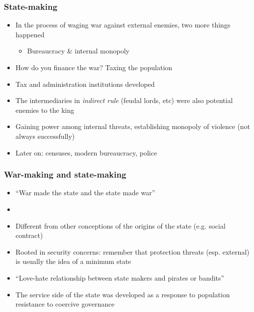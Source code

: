 \documentclass[utf8, xcolor=dvipsnames, handout]{beamer}
\begin{document}
\begin{frame}
\frametitle{State-making}
\centering

\begin{itemize}[<+->]
\item In the process of waging war against external enemies, two more things happened
\begin{itemize}
  \item Bureaucracy \& internal monopoly
\end{itemize}
\item How do you finance the war? Taxing the population
\item Tax and administration institutions developed
\item The intermediaries in \textit{indirect rule} (feudal lords, etc) were also potential enemies to the king
\item Gaining power among internal threats, establishing monopoly of violence (not always successfully)
\item Later on: censuses, modern bureaucracy, police
\end{itemize}

\end{frame}

\begin{frame}
\frametitle{War-making and state-making}
\centering

\begin{itemize}
\item ``War made the state and the state made war''
\item[]
\item Different from other conceptions of the origins of the state (e.g. social contract)
\item Rooted in security concerns: remember that protection threats (esp. external) is usually the idea of a minimum state
\item ``Love-hate relationship between state makers and pirates or bandits''
\item The service side of the state was developed as a response to population resistance to coercive governance
\end{itemize}

\end{frame}
\end{document}
